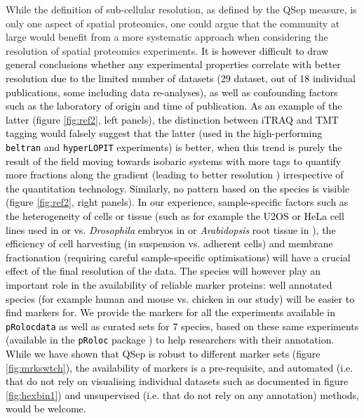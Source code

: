 \documentclass[12pt]{article}\usepackage[]{graphicx}\usepackage[]{color}
\begin{document}
While the definition of sub-cellular resolution, as defined by the
QSep measure, is only one aspect of spatial proteomics, one could
argue that the community at large would benefit from a more systematic
approach when considering the resolution of spatial proteomics
experiments. \textcolor{black}{It is however difficult to draw general
  conclusions whether any experimental properties correlate with
  better resolution due to the limited number of datasets
  (29 dataset, out of 18 individual
  publications, some including data re-analyses), as well as
  confounding factors such as the laboratory of origin and time of
  publication. As an example of the latter (figure \ref{fig:ref2},
  left panels), the distinction between iTRAQ and TMT tagging would
  falsely suggest that the latter (used in the high-performing
  \texttt{beltran} and \texttt{hyperLOPIT} experiments) is better,
  when this trend is purely the result of the field moving towards
  isobaric systems with more tags to quantify more fractions along the
  gradient (leading to better resolution \cite{Gatto:2014})
  irrespective of the quantitation technology. Similarly, no pattern
  based on the species is visible (figure \ref{fig:ref2}, right
  panels). In our experience, sample-specific factors such as the
  heterogeneity of cells or tissue (such as for example the U2OS or
  HeLa cell lines used in \cite{Thul:2017} or \cite{Itzhak:2016}
  vs. \textit{Drosophila} embryos in \cite{Tan:2009} or
  \textit{Arabidopsis} root tissue in \cite{Groen:2014}), the
  efficiency of cell harvesting (in suspension vs. adherent cells)
  and membrane fractionation (requiring careful sample-specific
  optimisations) will have a crucial effect of the final resolution of
  the data. The species will however play an important role in the
  availability of reliable marker proteins: well annotated species
  (for example human and mouse vs. chicken in our study) will be
  easier to find markers for. We provide the markers for all the
  experiments available in \texttt{pRolocdata} as well as curated sets
  for 7 species, based on these same experiments (available in the
  \texttt{pRoloc} package \cite{Gatto:2014a}) to help researchers with
  their annotation. While we have shown that QSep is robust to
  different marker sets (figure \ref{fig:mrkswtch}), the availability
  of markers is a pre-requisite, and automated (i.e. that do not rely
  on visualising individual datasets such as documented in figure
  \ref{fig:hexbin1}) and unsupervised (i.e. that do not rely on any
  annotation) methods, would be welcome.}
\end{document}
